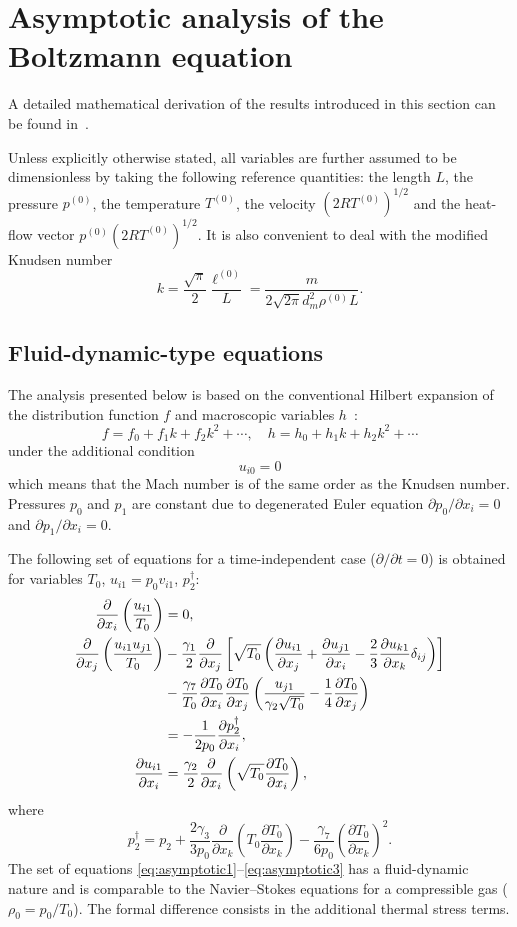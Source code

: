 \documentclass[smallextended, referee]{svjour3} %
\newcommand{\pder}[2][]{\frac{\partial#1}{\partial#2}}
\newcommand{\Pder}[2][]{\partial#1/\partial#2}
\begin{document}
\section{Asymptotic analysis of the Boltzmann equation}

A detailed mathematical derivation of the results introduced in this section
can be found in~\cite{Sone2002, Sone2007}.

Unless explicitly otherwise stated, all variables are further assumed to be dimensionless
by taking the following reference quantities:
the length \(L\), the pressure \(p^{(0)}\), the temperature \(T^{(0)}\),
the velocity \((2RT^{(0)})^{1/2}\) and the heat-flow vector \(p^{(0)}(2RT^{(0)})^{1/2}\).
It is also convenient to deal with the modified Knudsen number
\[ k = \frac{\sqrt\pi}2\frac{\ell^{(0)}}{L} = \frac{m}{2\sqrt{2\pi} d_m^2 \rho^{(0)}L}. \]

\subsection{Fluid-dynamic-type equations}

The analysis presented below is based on the conventional Hilbert expansion
of the distribution function \(f\) and macroscopic variables \(h\)~\cite{Hilbert1912}:
\[ f = f_0 + f_1k + f_2k^2 + \cdots, \quad h = h_0 + h_1k + h_2k^2 + \cdots \]
under the additional condition
\begin{equation}\label{eq:Mach_constraint}
	u_{i0} = 0
\end{equation}
which means that the Mach number is of the same order as the Knudsen number.
Pressures \(p_0\) and \(p_1\) are constant due to degenerated Euler equation
\(\Pder[p_0]{x_i} = 0 \) and \(\Pder[p_1]{x_i} = 0 \).

The following set of equations for a time-independent case (\(\Pder{t} = 0\))
is obtained for variables \(T_0\), \(u_{i1} = p_0v_{i1}\), \(p_2^\dag\):
\begin{align}
	\pder{x_i}\left(\frac{u_{i1}}{T_0}\right) &= 0, \label{eq:asymptotic1} \\
	\pder{x_j}\left(\frac{u_{i1}u_{j1}}{T_0}\right)
		&-\frac{\gamma_1}2\pder{x_j}\left[\sqrt{T_0}\left(
			\pder[u_{i1}]{x_j}+\pder[u_{j1}]{x_i}-\frac23\pder[u_{k1}]{x_k}\delta_{ij}\right
		)\right] \notag\\
		&- \frac{\gamma_7}{T_0}\pder[T_0]{x_i}\pder[T_0]{x_j}\left(\frac{u_{j1}}{\gamma_2\sqrt{T_0}} - \frac{1}4\pder[T_0]{x_j}\right) \notag\\
		&= -\frac1{2p_0}\pder[p_2^\dag]{x_i}, \label{eq:asymptotic2} \\
	\pder[u_{i1}]{x_i} &= \frac{\gamma_2}2\pder{x_i}\left(\sqrt{T_0}\pder[T_0]{x_i}\right), \label{eq:asymptotic3}
\end{align}
where
\[ 
	p_2^\dag = p_2 + 
		\frac{2\gamma_3}{3p_0}\pder{x_k}\left(T_0\pder[T_0]{x_k}\right) -
		\frac{\gamma_7}{6p_0}\left(\pder[T_0]{x_k}\right)^2.
\]
The set of equations \eqref{eq:asymptotic1}--\eqref{eq:asymptotic3} has a fluid-dynamic nature
and is comparable to the Navier--Stokes equations for a compressible gas (\(\rho_0 = p_0/T_0\)).
The formal difference consists in the additional thermal stress terms.
\end{document}
